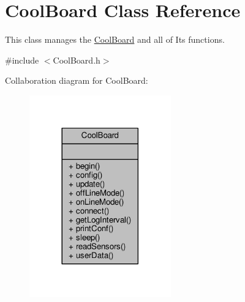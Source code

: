 \hypertarget{class_cool_board}{}\section{Cool\+Board Class Reference}
\label{class_cool_board}


This class manages the \hyperlink{class_cool_board}{Cool\+Board} and all of Its functions.  




{\ttfamily \#include $<$Cool\+Board.\+h$>$}



Collaboration diagram for Cool\+Board\+:
\nopagebreak
\begin{figure}[H]
\begin{center}
\leavevmode
\includegraphics[width=173pt]{class_cool_board__coll__graph}
\end{center}
\end{figure}
